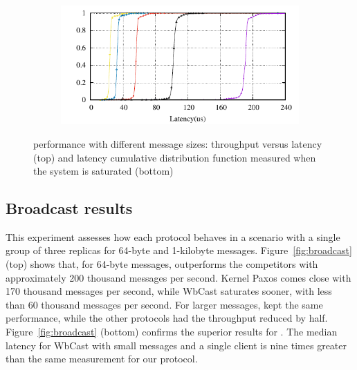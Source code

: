 \begin{figure}[htp!]
\begin{subfigure}{\columnwidth}
  \end{subfigure}
  \begin{subfigure}{\columnwidth}
    \centering
    \includegraphics[width=0.99\columnwidth]{figures/benchmark/graphs/figure-performance-vs-size-single-group-cdf-from-4k}
  \end{subfigure}
  \caption{\libname performance with different message sizes: throughput versus latency (top) and latency cumulative distribution function measured when the system is saturated (bottom)}
  \label{fig:1group_message_size}
\end{figure}

\subsection{Broadcast results}
\label{sec:evaluation:broadcast}

This experiment assesses how each protocol behaves in a scenario with a single group of three replicas for 64-byte and 1-kilobyte messages.
Figure~\ref{fig:broadcast} (top) shows that, for 64-byte messages, \libname outperforms the competitors with approximately 200 thousand messages per second. 
Kernel Paxos comes close with 170 thousand messages per second, while WbCast saturates sooner, with less than 60 thousand messages per second.
For larger messages, \libname kept the same performance, while the other protocols had the throughput reduced by half.
Figure~\ref{fig:broadcast} (bottom) confirms the superior results for \libname. The median latency for WbCast with small messages and a single client is nine times greater than the same measurement for our protocol.

